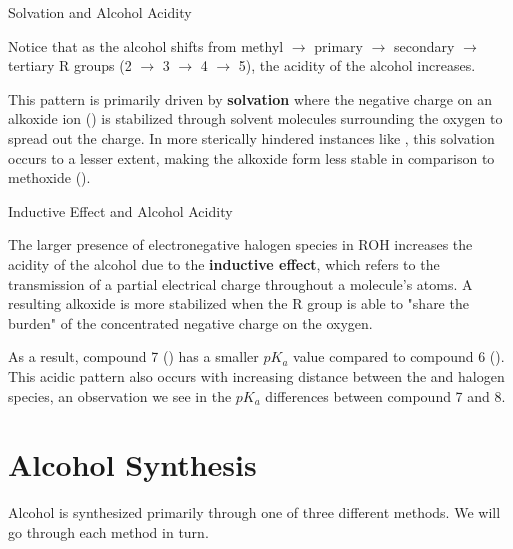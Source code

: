 \documentclass[10pt]{article}
\begin{document}
  \begin{core}{Solvation and Alcohol Acidity}

    Notice that as the alcohol shifts from methyl $\rightarrow$ primary $\rightarrow$ secondary $\rightarrow$ tertiary R groups (2 $\rightarrow$ 3 $\rightarrow$ 4 $\rightarrow$ 5), the acidity of the alcohol increases.
   
    This pattern is primarily driven by \textbf{solvation} where the negative charge on an alkoxide ion () is stabilized through solvent molecules surrounding the oxygen to spread out the charge. In more sterically hindered instances like , this solvation occurs to a lesser extent, making the alkoxide form less stable in comparison to methoxide ().

  \end{core}  

  \begin{core}{Inductive Effect and Alcohol Acidity} 

    The larger presence of electronegative halogen species in ROH increases the acidity of the alcohol due to the \textbf{inductive effect}, which refers to the transmission of a partial electrical charge throughout a molecule's atoms. A resulting alkoxide  is more stabilized when the R group is able to "share the burden" of the concentrated negative charge on the oxygen.

    As a result, compound 7 () has a smaller $pK_a$ value compared to compound 6 (). This acidic pattern also occurs with increasing distance between the  and halogen species, an observation we see in the $pK_a$ differences between compound 7 and 8.

  \end{core}

\section{Alcohol Synthesis}

  Alcohol is synthesized primarily through one of three different methods. We will go through each method in turn. 
\end{document}
